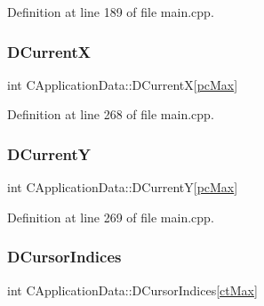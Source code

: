 Definition at line 189 of file main.\+cpp.

\hypertarget{classCApplicationData_a1dc7ee482a39f7978c71365ac540f97a}{}\label{classCApplicationData_a1dc7ee482a39f7978c71365ac540f97a} 
\subsubsection{\texorpdfstring{D\+CurrentX}{DCurrentX}}
{\footnotesize\ttfamily int C\+Application\+Data\+::\+D\+CurrentX\mbox{[}\hyperlink{GameDataTypes_8h_aafb0ca75933357ff28a6d7efbdd7602fa594a5c8dd3987f24e8a0f23f1a72cd34}{pc\+Max}\mbox{]}\hspace{0.3cm}{\ttfamily [protected]}}



Definition at line 268 of file main.\+cpp.

\hypertarget{classCApplicationData_a0ba39779ae11c8072258c6ddfebd6052}{}\label{classCApplicationData_a0ba39779ae11c8072258c6ddfebd6052} 
\subsubsection{\texorpdfstring{D\+CurrentY}{DCurrentY}}
{\footnotesize\ttfamily int C\+Application\+Data\+::\+D\+CurrentY\mbox{[}\hyperlink{GameDataTypes_8h_aafb0ca75933357ff28a6d7efbdd7602fa594a5c8dd3987f24e8a0f23f1a72cd34}{pc\+Max}\mbox{]}\hspace{0.3cm}{\ttfamily [protected]}}



Definition at line 269 of file main.\+cpp.

\hypertarget{classCApplicationData_a3f4e69d928f933bba6e1c388c5a720a2}{}\label{classCApplicationData_a3f4e69d928f933bba6e1c388c5a720a2} 
\subsubsection{\texorpdfstring{D\+Cursor\+Indices}{DCursorIndices}}
{\footnotesize\ttfamily int C\+Application\+Data\+::\+D\+Cursor\+Indices\mbox{[}\hyperlink{classCApplicationData_ad024b66b60017c45c47a85dbc636ae69a57f089bfb5f201e4f592dd2e41888a44}{ct\+Max}\mbox{]}\hspace{0.3cm}{\ttfamily [protected]}}



